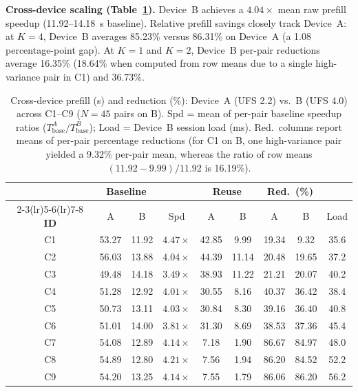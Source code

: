 \documentclass[10pt,conference]{IEEEtran}
\begin{document}
\textbf{Cross-device scaling (Table~\ref{tab:cross_device_scaling}).} Device~B achieves a $4.04\times$ mean raw prefill speedup (11.92--14.18~s baseline). Relative prefill savings closely track Device~A: at $K{=}4$, Device~B averages 85.23\% versus 86.31\% on Device~A (a 1.08 percentage-point gap). At $K{=}1$ and $K{=}2$, Device~B per-pair reductions average 16.35\% (18.64\% when computed from row means due to a single high-variance pair in C1) and 36.73\%.

\begin{table}[!htbp]
\centering
\caption{Cross-device prefill (s) and reduction (\%): Device~A (UFS 2.2) vs.\ B (UFS 4.0) across C1--C9 ($N{=}45$ pairs on B). Spd = mean of per-pair baseline speedup ratios ($T_{\text{base}}^A / T_{\text{base}}^B$); Load = Device~B session load (ms). Red.\ columns report means of per-pair percentage reductions (for C1 on B, one high-variance pair yielded a 9.32\% per-pair mean, whereas the ratio of row means $(11.92-9.99)/11.92$ is 16.19\%).}
\label{tab:cross_device_scaling}
\scriptsize
\setlength{\tabcolsep}{2.4pt}
\renewcommand{\arraystretch}{0.94}
\begin{tabular}{ccccccccc}
\toprule
 & \multicolumn{2}{c}{\textbf{Baseline}} & & \multicolumn{2}{c}{\textbf{Reuse}} & \multicolumn{2}{c}{\textbf{Red.\ (\%)}} & \\
\cmidrule(lr){2-3}\cmidrule(lr){5-6}\cmidrule(lr){7-8}
\textbf{ID} & A & B & Spd & A & B & A & B & Load \\
\midrule
C1 & 53.27 & 11.92 & $4.47\times$ & 42.85 & 9.99  & 19.34 & 9.32  & 35.6 \\
C2 & 56.03 & 13.88 & $4.04\times$ & 44.39 & 11.14 & 20.48 & 19.65 & 37.2 \\
C3 & 49.48 & 14.18 & $3.49\times$ & 38.93 & 11.22 & 21.21 & 20.07 & 40.2 \\
C4 & 51.28 & 12.92 & $4.01\times$ & 30.55 & 8.16  & 40.37 & 36.42 & 38.4 \\
C5 & 50.73 & 13.11 & $4.03\times$ & 30.84 & 8.30  & 39.16 & 36.40 & 40.8 \\
C6 & 51.01 & 14.00 & $3.81\times$ & 31.30 & 8.69  & 38.53 & 37.36 & 45.4 \\
C7 & 54.08 & 12.89 & $4.14\times$ & 7.18  & 1.90  & 86.67 & 84.97 & 48.0 \\
C8 & 54.89 & 12.80 & $4.21\times$ & 7.56  & 1.94  & 86.20 & 84.52 & 52.2 \\
C9 & 54.20 & 13.25 & $4.14\times$ & 7.55  & 1.79  & 86.06 & 86.20 & 56.2 \\
\bottomrule
\end{tabular}
\end{table}
\end{document}
